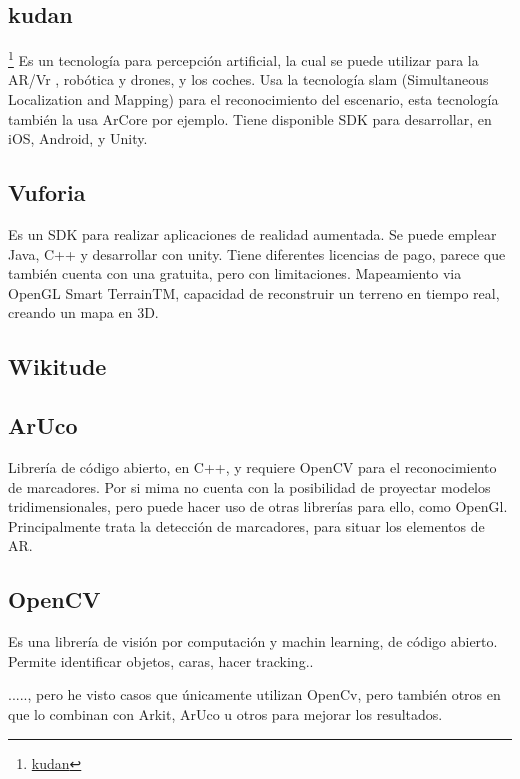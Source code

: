 \subsection{kudan}\footnote{\href{https://www.xlsoft.com/en/products/kudan/?utm_source=google&utm_medium=adwords&utm_campaign=cp01&gclid=Cj0KCQiAvJXxBRCeARIsAMSkAprma7nGzsXVWd9w5H4HSQzNoOkF2eJu8LzAtEXbaDALYPUdfBOOgpEaAoqoEALw_wcB}{kudan}}
Es un tecnología para percepción artificial, la cual se puede utilizar para la AR/Vr , robótica y drones, y los coches.
Usa la tecnología slam (Simultaneous Localization and Mapping) para el reconocimiento del escenario, esta tecnología también la usa ArCore por ejemplo.
Tiene disponible SDK para desarrollar, en iOS, Android, y Unity.

\subsection{Vuforia}
Es un SDK para realizar aplicaciones de realidad aumentada. Se puede emplear Java, C++ y desarrollar con unity. Tiene diferentes licencias de pago, parece que también cuenta con una gratuita, pero con limitaciones.
Mapeamiento via OpenGL
Smart TerrainTM, capacidad de reconstruir un terreno en tiempo real, creando un mapa en 3D.

\subsection{Wikitude}


\subsection{ArUco}
Librería de código abierto, en C++, y requiere OpenCV para el reconocimiento de marcadores.
Por si mima no cuenta con la posibilidad de proyectar modelos tridimensionales, pero puede hacer uso de otras librerías para ello, como OpenGl.
Principalmente trata la detección de marcadores, para situar los elementos de AR.

\subsection{OpenCV}
Es una librería de visión por computación y machin learning, de código abierto. Permite identificar objetos, caras, hacer tracking..

....., pero he visto casos que únicamente utilizan OpenCv, pero también otros en que lo combinan con Arkit, ArUco u otros para mejorar los resultados.

